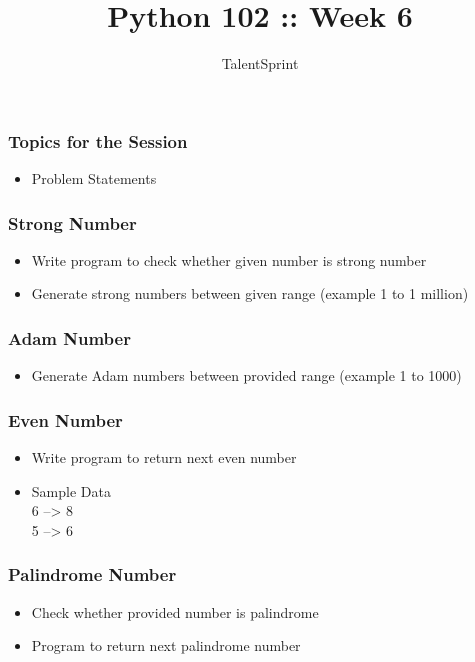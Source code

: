 \documentclass[14pt]{beamer}
\title{Python 102 :: Week 6}
\date{}
\author[TS]{TalentSprint}
\begin{document}
    \begin{frame}
        \titlepage
    \end{frame}
    \begin{frame}
        \frametitle{Topics for the Session}
        \begin{itemize}
            \item Problem Statements
        \end{itemize}
    \end{frame}

    \begin{frame}[containsverbatim]
        \frametitle{Strong Number}
        \begin{itemize}
        \item Write program to check whether given number is strong number
        \item Generate strong numbers between given range (example 1 to 1 million)
        \end{itemize}
    \end{frame}

    \begin{frame}[containsverbatim]
        \frametitle{Adam Number}
        \begin{itemize}
        \item Generate Adam numbers between provided range (example 1 to 1000)
        \end{itemize}
    \end{frame}

    \begin{frame}[containsverbatim]
        \frametitle{Even Number}
        \begin{itemize}
        \item Write program to return next even number
        \item Sample Data
		\\
        6 --> 8 \\
        5 --> 6
        \end{itemize}
    \end{frame}

    \begin{frame}[containsverbatim]
        \frametitle{Palindrome Number}
        \begin{itemize}
        \item Check whether provided number is palindrome
        \item Program to return next palindrome number
        \end{itemize}
    \end{frame}
\end{document}
